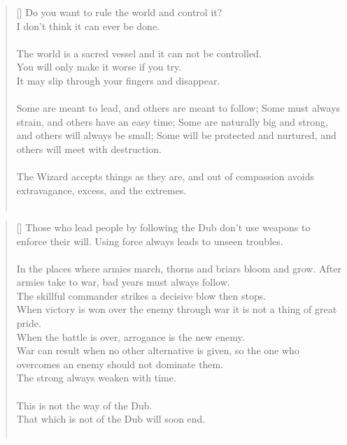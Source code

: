 \documentclass{article}
\begin{document}
\settowidth{\versewidth}{The Wizard leads byemptying people’s minds, filling their bellies, weakening their am- bitions, and making them become strong}
\begin{verse}[\versewidth]
Do you want to rule the world and control it?\\
I don't think it can ever be done.\\
\hfill\\
The world is a sacred vessel and it can not be controlled.\\
You will only make it worse if you try.\\
It may slip through your fingers and disappear.\\
\hfill\\
Some are meant to lead, and others are meant to follow; Some must always strain, and others have an easy time; Some are naturally big and strong, and others will always be small; Some will be protected and nurtured, and others will meet with destruction.\\
\hfill\\
The Wizard accepts things as they are, and out of compassion avoids extravagance, excess, and the extremes.\\
\hfill\\
\end{verse}

\settowidth{\versewidth}{The Wizard leads byemptying people’s minds, filling their bellies, weakening their am- bitions, and making them become strong}
\begin{verse}[\versewidth]
Those who lead people by following the Dub don't use weapons to enforce their will. 
Using force always leads to unseen troubles.\\
\hfill\\
In the places where armies march, thorns and briars bloom and grow. 
After armies take to war, bad years must always follow.\\
The skillful commander strikes a decisive blow then stops.\\
When victory is won over the enemy through war it is not a thing of great pride.\\
When the battle is over, arrogance is the new enemy.\\
War can result when no other alternative is given, so the one who overcomes an enemy should not dominate them.\\
The strong always weaken with time.\\
\hfill\\
This is not the way of the Dub.\\
That which is not of the Dub will soon end.\\
\hfill\\
\end{verse}
\end{document}

